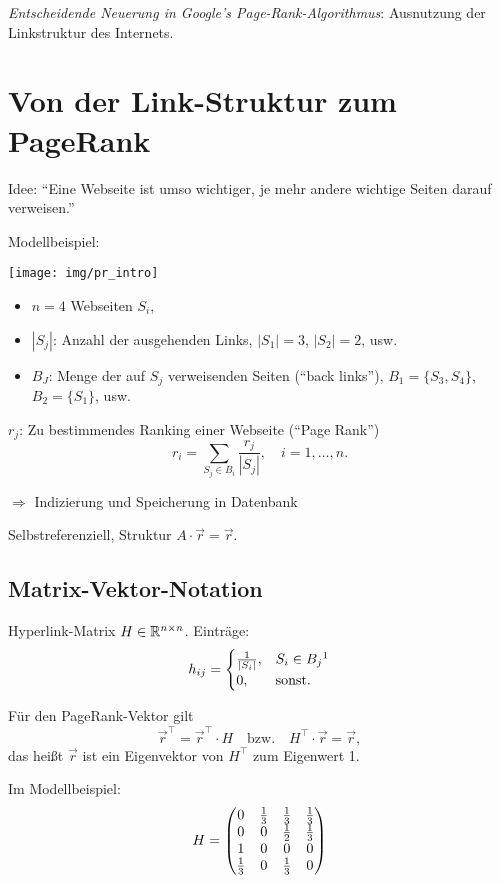 \emph{Entscheidende Neuerung in Google's Page-Rank-Algorithmus}: Ausnutzung der
Link\-struk\-tur des Internets.
  
\section{Von der Link-Struktur zum PageRank}
Idee: ``Eine Webseite ist umso wichtiger, je mehr andere wichtige Seiten darauf
verweisen.''

Modellbeispiel:
\begin{center}
  \begin{minipage}{5cm}
    \texttt{[image: img/pr\_intro]}
  \end{minipage}
  \begin{minipage}{9cm}
    \begin{itemize}
    \item $n = 4$ Webseiten $S_i$,
    \item $|S_j|$: Anzahl der ausgehenden Links, $|S_1| = 3$, $|S_2| = 2$, usw.
    \item $B_J$: Menge der auf $S_j$ verweisenden Seiten (``back links''), $B_1
      = \{ S_3, S_4 \}$, $B_2 = \{S_1\}$, usw.
    \end{itemize}
  \end{minipage}
\end{center}
$r_j$: Zu bestimmendes Ranking einer Webseite (``Page Rank'')
\[ r_i = \sum_{S_j \in B_i} \frac{r_j}{|S_j|}, \quad i = 1, \ldots, n. \]

$\Rightarrow$ Indizierung und Speicherung in Datenbank

Selbstreferenziell, Struktur $A \cdot \vec{r} = \vec{r}$.

\subsection*{Matrix-Vektor-Notation}
Hyperlink-Matrix $H \in \mathbb{R}^{n \times n}$. Einträge:
\[ h_{ij} = \begin{cases}
    \rez{|S_i|}, & S_i \in B_j\footnotemark\\
    0, & \text{sonst.}
  \end{cases}
\]

Für den PageRank-Vektor gilt
\[ \vec{r}^\top = \vec{r}^\top \cdot H
  \quad \text{bzw.} \quad
  H^\top \cdot \vec{r} = \vec{r},
\]
das heißt $\vec{r}$ ist ein Eigenvektor von $H^\top$ zum Eigenwert 1.

Im Modellbeispiel:
\[ H = \begin{pmatrix}
    0 & \frac{1}{3} & \frac{1}{3} & \frac{1}{3} \\
    0 & 0 & \frac{1}{2} & \frac{1}{3} \\
    1 & 0 & 0 & 0 \\
    \frac{1}{3} & 0 & \frac{1}{3} & 0
  \end{pmatrix}
\]

